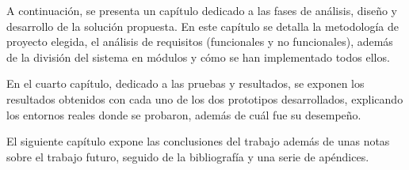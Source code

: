A continuación, se presenta un capítulo dedicado a las fases de análisis, diseño y desarrollo de la solución propuesta. En este capítulo se detalla la metodología de proyecto elegida, el análisis de requisitos (funcionales y no funcionales), además de la división del sistema en módulos y cómo se han implementado todos ellos.

En el cuarto capítulo, dedicado a las pruebas y resultados, se exponen los resultados obtenidos con cada uno de los dos prototipos desarrollados, explicando los entornos reales donde se probaron, además de cuál fue su desempeño.

El siguiente capítulo expone las conclusiones del trabajo además de unas notas sobre el trabajo futuro, seguido de la bibliografía y una serie de apéndices. %

